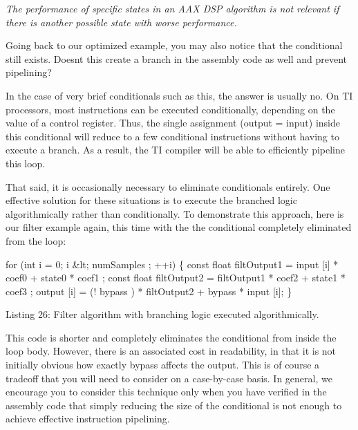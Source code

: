  {\itshape The performance of specific states in an A\+A\+X D\+S\+P algorithm is not relevant if there is another possible state with worse performance.} 

Going back to our optimized example, you may also notice that the conditional still exists. Doesn\textquotesingle{}t this create a branch in the assembly code as well and prevent pipelining?

In the case of very brief conditionals such as this, the answer is usually no. On T\+I processors, most instructions can be executed conditionally, depending on the value of a control register. Thus, the single assignment {\ttfamily (output = input)} inside this conditional will reduce to a few conditional instructions without having to execute a branch. As a result, the T\+I compiler will be able to efficiently pipeline this loop.

That said, it is occasionally necessary to eliminate conditionals entirely. One effective solution for these situations is to execute the branched logic algorithmically rather than conditionally. To demonstrate this approach, here is our filter example again, this time with the the conditional completely eliminated from the loop\+:


\begin{DoxyCode}
\textcolor{keywordflow}{for} (\textcolor{keywordtype}{int} i = 0; i &lt; numSamples ; ++i)
\{
    \textcolor{keyword}{const} \textcolor{keywordtype}{float} filtOutput1 = input [i] * coef0 + state0 * coef1 ;
    \textcolor{keyword}{const} \textcolor{keywordtype}{float} filtOutput2 = filtOutput1 * coef2 + state1 * coef3 ;
    output [i] = (! bypass ) * filtOutput2 + bypass * input [i];
\} 
\end{DoxyCode}
  Listing 26\+: Filter algorithm with branching logic executed algorithmically.

This code is shorter and completely eliminates the conditional from inside the loop body. However, there is an associated cost in readability, in that it is not initially obvious how exactly {\ttfamily bypass} affects the output. This is of course a tradeoff that you will need to consider on a case-\/by-\/case basis. In general, we encourage you to consider this technique only when you have verified in the assembly code that simply reducing the size of the conditional is not enough to achieve effective instruction pipelining.

